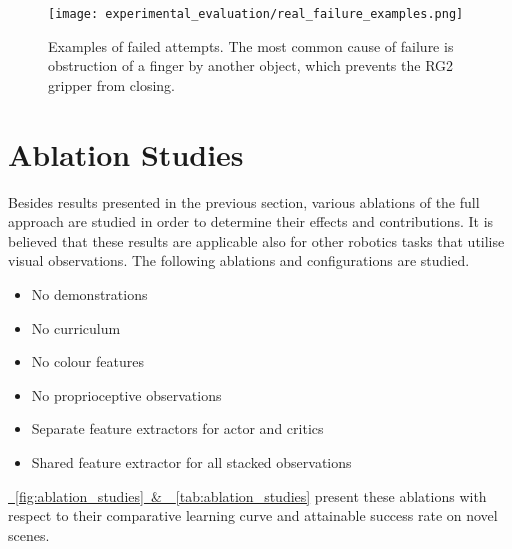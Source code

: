 \begin{figure}[ht]
    \centering
    \texttt{[image: experimental\_evaluation/real\_failure\_examples.png]}
    \caption{Examples of failed attempts. The most common cause of failure is obstruction of a finger by another object, which prevents the RG2 gripper from closing.}
    \label{fig:sim_to_real_failure_examples}
\end{figure}

\newpage

\section{Ablation Studies}

Besides results presented in the previous section, various ablations of the full approach are studied in order to determine their effects and contributions. It is believed that these results are applicable also for other robotics tasks that utilise visual observations. The following ablations and configurations are studied.
\vspace{-\topsep}
\begin{itemize}
    \itemsep -2.5mm
    \item No demonstrations
    \item No curriculum
    \item No colour features
    \item No proprioceptive observations
    \item Separate feature extractors for actor and critics
    \item Shared feature extractor for all stacked observations
\end{itemize}
\vspace{-\topsep}
\hyperref[fig:ablation_studies]{\figurename~\ref*{fig:ablation_studies}~\&~\tablename~\ref*{tab:ablation_studies}} present these ablations with respect to their comparative learning curve and attainable success rate on novel scenes.

